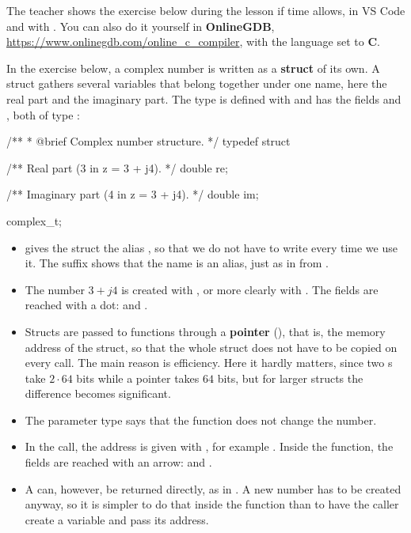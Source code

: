 The teacher shows the exercise below during the lesson if time allows, in VS Code and with
. You can
also do it yourself in \textbf{OnlineGDB}, \url{https://www.onlinegdb.com/online_c_compiler}, with
the language set to \textbf{C}.

In the exercise below, a complex number is written as a \textbf{struct} of its own. A struct gathers
several variables that belong together under one name, here the real part and the imaginary part.
The type  is defined with  and has the fields  and
, both of type :
\begin{ccode}
/**
 * @brief Complex number structure.
 */
typedef struct
{
    /** Real part (3 in z = 3 + j4). */
    double re;

    /** Imaginary part (4 in z = 3 + j4). */
    double im;
} complex_t;
\end{ccode}
\begin{itemize}
  \item {} gives the struct the alias , so that we do not have to write
     every time we use it. The suffix  shows that the name is an alias, just
    as in  from .
  \item The number $3 + j4$ is created with , or more
    clearly with . The fields are reached with a
    dot:  and .
  \item Structs are passed to functions through a \textbf{pointer} (), that is, the
    memory address of the struct, so that the whole struct does not have to be copied on every call.
    The main reason is efficiency. Here it hardly matters, since two s take $2 \cdot
    64$ bits while a pointer takes $64$ bits, but for larger structs the difference becomes
    significant.
  \item The parameter type  says that the function does not change the
    number.
  \item In the call, the address is given with \code{&}, for example .
    Inside the function, the fields are reached with an arrow:  and .
  \item A  can, however, be returned directly, as in . A
    new number has to be created anyway, so it is simpler to do that inside the function than to
    have the caller create a variable and pass its address.
\end{itemize}

